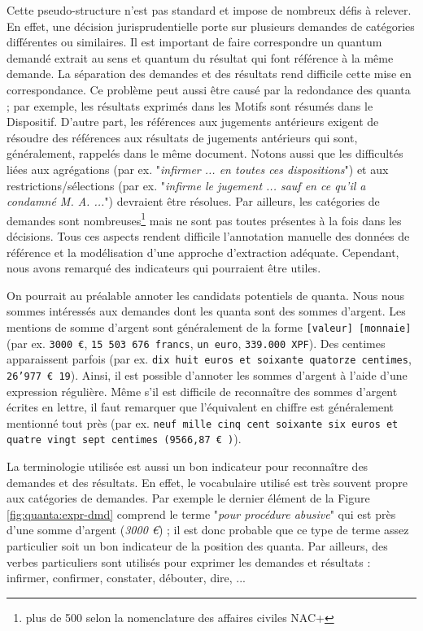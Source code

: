  Cette pseudo-structure n'est pas standard et impose de nombreux défis à relever. En effet, une décision jurisprudentielle porte sur plusieurs demandes de catégories différentes ou similaires. Il est important de faire correspondre un quantum demandé extrait au sens et quantum du résultat qui font référence à la même demande. La séparation des demandes et des résultats rend difficile cette mise en correspondance. Ce problème peut aussi être causé par la redondance des quanta ; par exemple, les résultats exprimés dans les Motifs sont résumés dans le Dispositif. D'autre part, les références aux jugements antérieurs exigent de résoudre des références aux résultats de jugements antérieurs qui sont, généralement, rappelés dans le même document. Notons aussi que les difficultés liées aux agrégations (par ex. "\textit{infirmer ... en toutes ces dispositions}") et aux restrictions/sélections (par ex. "\textit{infirme le jugement ... sauf en ce qu'il a condamné M. A. ...}") devraient être résolues. Par ailleurs, les catégories de demandes sont nombreuses\footnote{plus de 500 selon la nomenclature des affaires civiles NAC+} mais ne sont pas toutes présentes à la fois dans les décisions. Tous ces aspects rendent difficile l'annotation manuelle des données de référence et la modélisation d'une approche d'extraction adéquate. Cependant, nous avons remarqué des indicateurs qui pourraient être utiles.

On pourrait au préalable annoter les candidats potentiels de quanta. Nous nous sommes intéressés aux demandes dont les quanta sont des sommes d'argent. Les mentions de somme d'argent sont généralement de la forme \og \texttt{[valeur] [monnaie]} \fg{} (par ex. \texttt{3000 \euro}, \texttt{15 503 676 francs}, \texttt{un euro}, \texttt{339.000 XPF}). Des centimes apparaissent parfois (par ex. \texttt{dix huit euros et soixante quatorze centimes}, \texttt{26'977 \euro{}  19}).  Ainsi, il est possible d'annoter les sommes d'argent à l'aide d'une expression régulière. Même s'il est difficile de reconnaître des sommes d'argent écrites en lettre, il faut remarquer que l'équivalent en chiffre est généralement mentionné tout près (par ex. \texttt{neuf mille cinq cent soixante six euros et quatre vingt sept centimes (9566,87 \euro{}  )}). 

La terminologie utilisée est aussi un bon indicateur pour reconnaître des demandes et des résultats. En effet, le vocabulaire utilisé est très souvent propre aux catégories de demandes. Par exemple le dernier élément de la Figure \ref{fig:quanta:expr-dmd} comprend le terme "\textit{pour procédure abusive}" qui est près d'une somme d'argent (\textit{3000 \euro{}}) ; il est donc probable que ce type de terme assez particulier soit un bon indicateur de la position des quanta. Par ailleurs, des verbes particuliers sont utilisés pour exprimer les demandes et résultats : infirmer, confirmer, constater, débouter, dire, ... %




